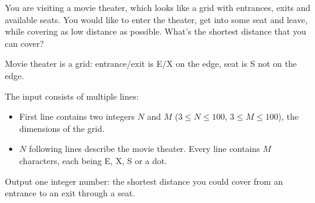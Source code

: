 \problemname{\problemyamlname}


\newcommand{\minn}{3}
\newcommand{\maxn}{100}
\newcommand{\minm}{3}
\newcommand{\maxm}{100}

You are visiting a movie theater, which looks like a grid with entrances, exits and available seats. You would like to enter the theater, get into some seat and leave, while covering as low distance as possible. What's the shortest distance that you can cover?

Movie theater is a grid: entrance/exit is E/X on the edge, seat is S not on the edge.

\begin{Input}
    The input consists of multiple lines:
    \begin{itemize}
        \item First line contains two integers $N$ and $M$ ($\minn \leq N \leq \maxn$, $\minm \leq M \leq \maxm$), the dimensions of the grid.
        \item $N$ following lines describe the movie theater. Every line contains $M$ characters, each being E, X, S or a dot.
     \end{itemize}
\end{Input}

\begin{Output}
    Output one integer number: the shortest distance you could cover from an entrance to an exit through a seat.
\end{Output}
